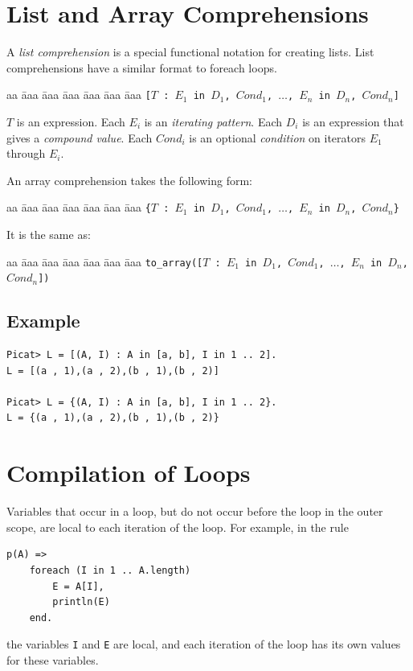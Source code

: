 \section{List and Array Comprehensions}
A \emph{list comprehension} is a special functional notation for creating lists.  List comprehensions have a similar format to foreach loops.
\begin{tabbing}
aa \= aaa \= aaa \= aaa \= aaa \= aaa \= aaa \kill
\> \> \texttt{[$T$ : $E_1$ \texttt{in} $D_1$, $Cond_1$, $\ldots$, $E_n$ in $D_n$, $Cond_n$]} 
\end{tabbing}
$T$ is an expression.  Each $E_i$ is an \emph{iterating pattern}.  Each $D_i$ is an expression that gives a \emph{compound value}.  Each $Cond_i$ is an optional \emph{condition} on iterators $E_1$ through $E_i$.

An array comprehension takes the following form:
\begin{tabbing}
aa \= aaa \= aaa \= aaa \= aaa \= aaa \= aaa \kill
\> \> \texttt{\{$T$ : $E_1$ \texttt{in} $D_1$, $Cond_1$, $\ldots$, $E_n$ in $D_n$, $Cond_n$\}} 
\end{tabbing}
It is the same as:
\begin{tabbing}
aa \= aaa \= aaa \= aaa \= aaa \= aaa \= aaa \kill
\> \> \texttt{to\_array([$T$ : $E_1$ \texttt{in} $D_1$, $Cond_1$, $\ldots$, $E_n$ in $D_n$, $Cond_n$])} 
\end{tabbing}

\subsection*{Example}
\begin{verbatim}
Picat> L = [(A, I) : A in [a, b], I in 1 .. 2].
L = [(a , 1),(a , 2),(b , 1),(b , 2)]

Picat> L = {(A, I) : A in [a, b], I in 1 .. 2}.
L = {(a , 1),(a , 2),(b , 1),(b , 2)}
\end{verbatim}

\section{Compilation of Loops}
Variables that occur in a loop, but do not occur before the loop in the outer scope, are local to each iteration of the loop. For example, in the rule
\begin{verbatim}
p(A) =>
    foreach (I in 1 .. A.length)
        E = A[I],
        println(E)
    end.
\end{verbatim}
the variables \texttt{I} and \texttt{E} are local, and each iteration of the loop has its own values for these variables.

